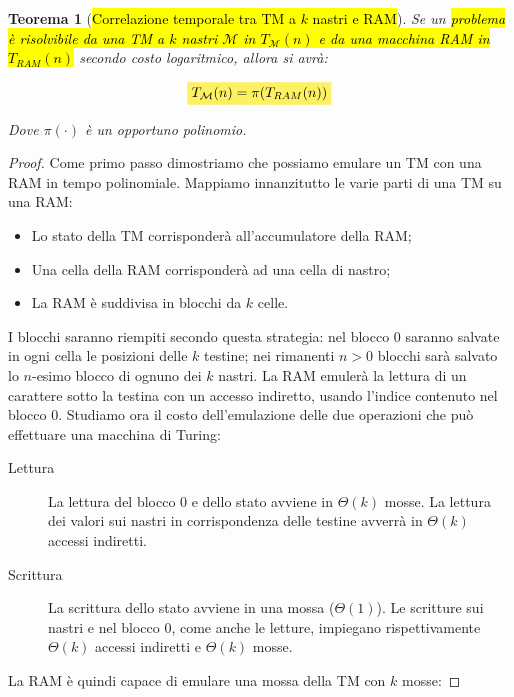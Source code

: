 \documentclass[a4paper,11pt,twoside]{article}
\theoremstyle{plain}
\newtheorem{thm}{Teorema}[section]
\theoremstyle{definition}
\theoremstyle{remark}
\newcommand{\mhl}[1]{\colorbox{hlcolor}{$\displaystyle #1$}}
\begin{document}
\begin{thm}[\hl{Correlazione temporale tra TM a $k$ nastri e RAM}]\label{thm:corr-tm-ram}
  Se un \hl{problema è risolvibile da una TM a $k$ nastri $\mathcal{M}$ in
  $T_\mathcal{M}(n)$ e da una macchina RAM in $T_{RAM}(n)$} secondo costo
  logaritmico, allora si avrà:

  \begin{equation}
    \mhl{ T_\mathcal{M}(n) = \pi(T_{RAM}(n)) }
  \end{equation}

  Dove $\pi(\cdot)$ è un opportuno polinomio.
\end{thm}
\begin{proof}
  Come primo passo dimostriamo che possiamo emulare un TM con una RAM in tempo
  polinomiale. Mappiamo innanzitutto le varie parti di una TM su una RAM\@:

  \begin{itemize}
    \item Lo stato della TM corrisponderà all'accumulatore della RAM\@;
    \item Una cella della RAM corrisponderà ad una cella di nastro;
    \item La RAM è suddivisa in blocchi da $k$ celle.
  \end{itemize}

  I blocchi saranno riempiti secondo questa strategia: nel blocco $0$ saranno
  salvate in ogni cella le posizioni delle $k$ testine; nei rimanenti $n>0$
  blocchi sarà salvato lo $n$-esimo blocco di ognuno dei $k$ nastri. La RAM
  emulerà la lettura di un carattere sotto la testina con un accesso indiretto,
  usando l'indice contenuto nel blocco $0$. Studiamo ora il costo
  dell'emulazione delle due operazioni che può effettuare una macchina di
  Turing:

  \begin{description}
    \item[Lettura] La lettura del blocco $0$ e dello stato avviene in
      $\Theta(k)$ mosse. La lettura dei valori sui nastri in corrispondenza
      delle testine avverrà in $\Theta(k)$ accessi indiretti.
    \item[Scrittura] La scrittura dello stato avviene in una mossa
      ($\Theta(1)$). Le scritture sui nastri e nel blocco $0$, come anche le
      letture, impiegano rispettivamente $\Theta(k)$ accessi indiretti e
      $\Theta(k)$ mosse.
  \end{description}

  La RAM è quindi capace di emulare una mossa della TM con $k$ mosse:


\end{proof}
\end{document}
